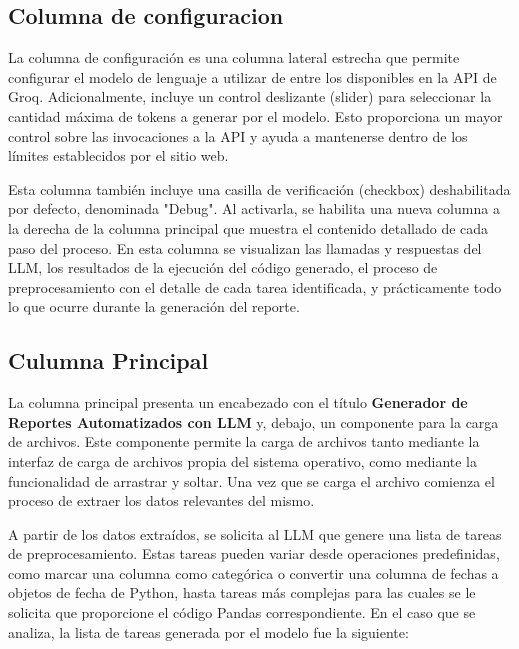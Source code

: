 \subsection{Columna de configuracion}
La columna de configuración es una columna lateral estrecha que permite configurar el modelo de lenguaje a utilizar de entre los disponibles en la API de Groq.  Adicionalmente, incluye un control deslizante (slider) para seleccionar la cantidad máxima de tokens a generar por el modelo. Esto proporciona un mayor control sobre las invocaciones a la API y ayuda a mantenerse dentro de los límites establecidos por el sitio web.

Esta columna también incluye una casilla de verificación (checkbox) deshabilitada por defecto, denominada "Debug". Al activarla, se habilita una nueva columna a la derecha de la columna principal que muestra el contenido detallado de cada paso del proceso. En esta columna se visualizan las llamadas y respuestas del LLM, los resultados de la ejecución del código generado, el proceso de preprocesamiento con el detalle de cada tarea identificada, y prácticamente todo lo que ocurre durante la generación del reporte.

\subsection{Culumna Principal}
La columna principal presenta un encabezado con el título \textbf{Generador de Reportes Automatizados con LLM} y, debajo, un componente para la carga de archivos.  Este componente permite la carga de archivos tanto mediante la interfaz de carga de archivos propia del sistema operativo, como mediante la funcionalidad de arrastrar y soltar. Una vez que se carga el archivo comienza el proceso de extraer los datos relevantes del mismo.

A partir de los datos extraídos, se solicita al LLM que genere una lista de tareas de preprocesamiento.  Estas tareas pueden variar desde operaciones predefinidas, como marcar una columna como categórica o convertir una columna de fechas a objetos de fecha de Python, hasta tareas más complejas para las cuales se le solicita que proporcione el código Pandas correspondiente. En el caso que se analiza, la lista de tareas generada por el modelo fue la siguiente:



